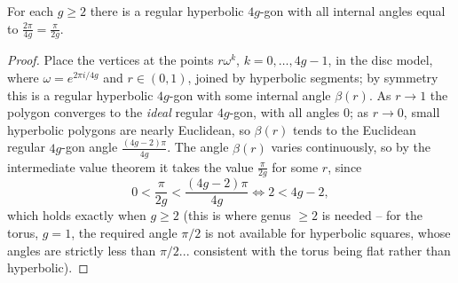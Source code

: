 \documentclass[a4paper]{scrartcl}
\begin{document}
\begin{lemma}\label{lem:4ggon}
    For each $g \geq 2$ there is a regular hyperbolic $4g$-gon with all internal angles equal to $\frac{2\pi}{4g} = \frac{\pi}{2g}$.
\end{lemma}
\begin{proof}
    Place the vertices at the points $r \omega^k$, $k = 0, \dots, 4g - 1$, in the disc model, where $\omega = e^{2\pi i/4g}$ and $r \in (0, 1)$, joined by hyperbolic segments; by symmetry this is a regular hyperbolic $4g$-gon with some internal angle $\beta(r)$. As $r \rightarrow 1$ the polygon converges to the \emph{ideal} regular $4g$-gon, with all angles $0$; as $r \rightarrow 0$, small hyperbolic polygons are nearly Euclidean, so $\beta(r)$ tends to the Euclidean regular $4g$-gon angle $\frac{(4g - 2)\pi}{4g}$. The angle $\beta(r)$ varies continuously, so by the intermediate value theorem it takes the value $\frac{\pi}{2g}$ for some $r$, since
    $$
    0 < \frac{\pi}{2g} < \frac{(4g-2)\pi}{4g} \iff 2 < 4g - 2,
    $$
    which holds exactly when $g \geq 2$ (this is where genus $\geq 2$ is needed -- for the torus, $g = 1$, the required angle $\pi/2$ is not available for hyperbolic squares, whose angles are strictly less than $\pi/2$... consistent with the torus being flat rather than hyperbolic).
\end{proof}
\end{document}
